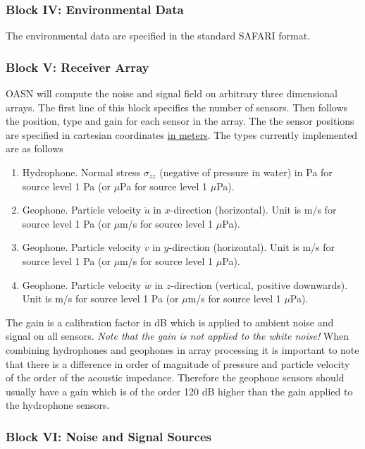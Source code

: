 \subsubsection{Block IV: Environmental Data }

The environmental data are specified in the standard SAFARI format.

\subsubsection{Block V: Receiver Array}

OASN will compute the noise and signal field on arbitrary
three dimensional arrays. The first line of this block specifies the
number of sensors. Then follows the position, type and gain for each
sensor in the array. The the sensor positions are specified in
cartesian coordinates \underline{in meters}. The types currently
implemented are as follows

\begin{enumerate}
\item Hydrophone. Normal stress $ \sigma_{zz}$ (negative of pressure in
water) in Pa for source level 1 Pa (or $\mu$Pa for source level 1 $\mu$Pa). 
\item Geophone. Particle velocity $\dot{u}$ in $x$-direction
(horizontal).  Unit is
m/s for source level 1 Pa (or $\mu$m/s for source level 1 $\mu$Pa).
\item Geophone. Particle velocity $\dot{v}$ in $y$-direction
(horizontal).  Unit is
m/s for source level 1 Pa (or $\mu$m/s for source level 1 $\mu$Pa).
\item Geophone. Particle velocity $\dot{w}$ in $z$-direction
(vertical, positive downwards).  Unit is
m/s for source level 1 Pa (or $\mu$m/s for source level 1 $\mu$Pa).
\end{enumerate}

The gain is a calibration factor in dB which is applied to
ambient noise and signal on all sensors. {\em Note that the gain is not
applied to the white noise!} When combining hydrophones and geophones
in array processing it is important to note that there is a  difference in
order of magnitude of pressure and particle velocity of the order of
the acoustic impedance. Therefore the geophone sensors should usually
have a gain which is of the order 120 dB higher than the gain applied to the
hydrophone sensors.

\subsubsection{Block VI: Noise and Signal Sources}


